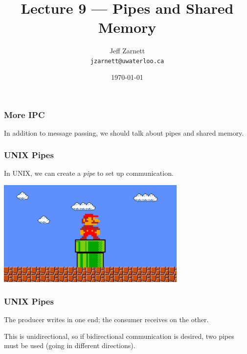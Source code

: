

\title{Lecture 9 --- Pipes and Shared Memory}

\author{Jeff Zarnett \\ \small \texttt{jzarnett@uwaterloo.ca}}
\date{\today}




\begin{frame}
	\titlepage

\end{frame}

\begin{frame}
	\frametitle{More IPC}

	In addition to message passing, we should talk about pipes and shared memory.


\end{frame}


\begin{frame}
	\frametitle{UNIX Pipes}

	In UNIX, we can create a \textit{pipe} to set up communication.

	\begin{center}
		\includegraphics[width=0.7\textwidth]{images/mario-pipe.jpg}
	\end{center}

\end{frame}

\begin{frame}
	\frametitle{UNIX Pipes}




	The producer writes in one end; the consumer receives on the other.

	This is unidirectional, so if bidirectional communication is desired, two pipes must be used (going in different directions).

\end{frame}

